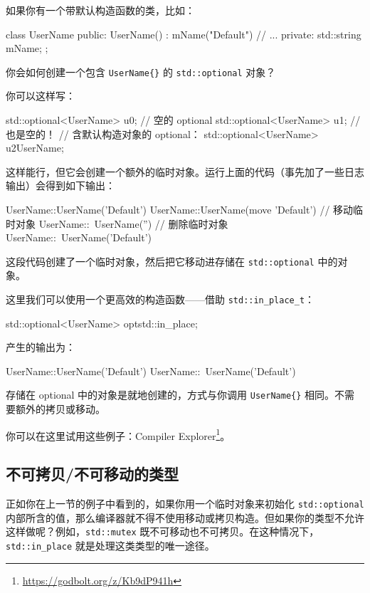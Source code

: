 如果你有一个带默认构造函数的类，比如：

\begin{codebox}[cpp]
class UserName {
public:
UserName() : mName("Default") { }
// ...
private:
std::string mName;
};
\end{codebox}

你会如何创建一个包含 \texttt{UserName\{\}} 的 \texttt{std::optional} 对象？

你可以这样写：

\begin{codebox}[cpp]
std::optional<UserName> u0;
// 空的 optional
std::optional<UserName> u1{}; // 也是空的！
// 含默认构造对象的 optional：
std::optional<UserName> u2{UserName{}};
\end{codebox}

这样能行，但它会创建一个额外的临时对象。运行上面的代码（事先加了一些日志输出）会得到如下输出：

\begin{codebox}[cpp]
UserName::UserName('Default')
UserName::UserName(move 'Default')
// 移动临时对象
UserName::~UserName('')
// 删除临时对象
UserName::~UserName('Default')
\end{codebox}

这段代码创建了一个临时对象，然后把它移动进存储在 \texttt{std::optional} 中的对象。

这里我们可以使用一个更高效的构造函数——借助 \texttt{std::in\_place\_t}：

\begin{codebox}[cpp]
std::optional<UserName> opt{std::in_place};
\end{codebox}

产生的输出为：

\begin{codebox}[cpp]
UserName::UserName('Default')
UserName::~UserName('Default')
\end{codebox}

存储在 optional 中的对象是就地创建的，方式与你调用 \texttt{UserName\{\}} 相同。不需要额外的拷贝或移动。

你可以在这里试用这些例子：Compiler Explorer\footnote{\url{https://godbolt.org/z/Kb9dP941h}}。

\subsection{不可拷贝/不可移动的类型}

正如你在上一节的例子中看到的，如果你用一个临时对象来初始化 \texttt{std::optional} 内部所含的值，那么编译器就不得不使用移动或拷贝构造。但如果你的类型不允许这样做呢？例如，\texttt{std::mutex} 既不可移动也不可拷贝。在这种情况下，\texttt{std::in\_place} 就是处理这类类型的唯一途径。

